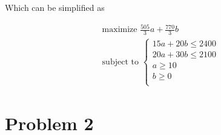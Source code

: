 \documentclass[a4paper, 10pt, twoside]{article}
\begin{document}
Which can be simplified as

\begin{align*}
     & \text{maximize } \frac{505}{3}a + \frac{770}{3}b \\
     & \text{subject to }
    \begin{cases}
        15 a + 20 b \le 2400 \\
        20 a + 30 b \le 2100 \\
        a \ge 10                             \\
        b \ge 0                              \\
    \end{cases}
\end{align*}

\section*{Problem 2}
\end{document}
